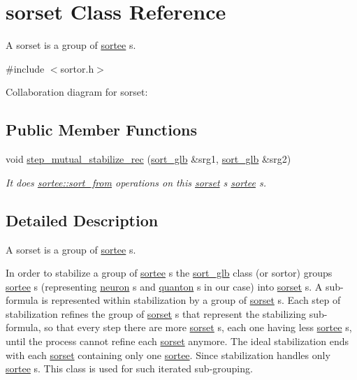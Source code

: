 \hypertarget{classsorset}{}\section{sorset Class Reference}
\label{classsorset}


A sorset is a group of \hyperlink{classsortee}{sortee} s.  




{\ttfamily \#include $<$sortor.\+h$>$}



Collaboration diagram for sorset\+:
\subsection*{Public Member Functions}
\begin{DoxyCompactItemize}
\item 
void \hyperlink{classsorset_a9a85b9412bc1fc5bea86d416e52b55c7}{step\+\_\+mutual\+\_\+stabilize\+\_\+rec} (\hyperlink{classsort__glb}{sort\+\_\+glb} \&srg1, \hyperlink{classsort__glb}{sort\+\_\+glb} \&srg2)
\begin{DoxyCompactList}\small\item\em It does \hyperlink{classsortee_a5cc113e22e62dfcb3869c2786ae5345e}{sortee\+::sort\+\_\+from} operations on this \hyperlink{classsorset}{sorset} \textquotesingle{}s \hyperlink{classsortee}{sortee} s. \end{DoxyCompactList}\end{DoxyCompactItemize}


\subsection{Detailed Description}
A sorset is a group of \hyperlink{classsortee}{sortee} s. 

In order to stabilize a group of \hyperlink{classsortee}{sortee} s the \hyperlink{classsort__glb}{sort\+\_\+glb} class (or sortor) groups \hyperlink{classsortee}{sortee} s (representing \hyperlink{classneuron}{neuron} s and \hyperlink{classquanton}{quanton} s in our case) into \hyperlink{classsorset}{sorset} s. A sub-\/formula is represented within stabilization by a group of \hyperlink{classsorset}{sorset} s. Each step of stabilization refines the group of \hyperlink{classsorset}{sorset} s that represent the stabilizing sub-\/formula, so that every step there are more \hyperlink{classsorset}{sorset} s, each one having less \hyperlink{classsortee}{sortee} s, until the process cannot refine each \hyperlink{classsorset}{sorset} anymore. The ideal stabilization ends with each \hyperlink{classsorset}{sorset} containing only one \hyperlink{classsortee}{sortee}. Since stabilization handles only \hyperlink{classsortee}{sortee} s. This class is used for such iterated sub-\/grouping. 

